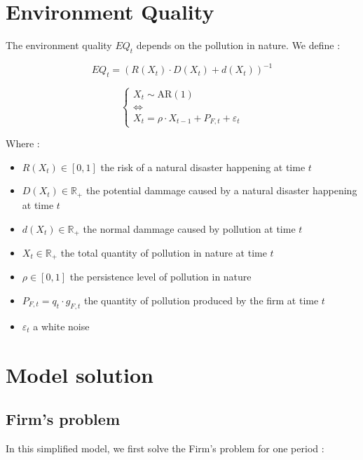 \documentclass{article}
\begin{document}
\section{Environment Quality}

The environment quality $EQ_{t}$ depends on the pollution in nature. We define : 

\begin{equation}
    EQ_{t}=\left(R(X_{t})\cdot D(X_{t})+d(X_{t})\right)^{-1}
\end{equation}

\begin{equation}
    \begin{cases}
        X_{t}\sim \text{AR}(1) \\
        \iff \\
        X_{t}=\rho\cdot X_{t-1}+P_{F,t}+\varepsilon_{t}
    \end{cases}
\end{equation}

Where :
\begin{itemize}
    \item $R(X_t)\in\left[0,1\right]$ the risk of a natural disaster happening at time $t$
    \item $D(X_t)\in\mathbb{R}_{+}$ the potential dammage caused by a natural disaster happening at time $t$
    \item $d(X_t)\in\mathbb{R}_{+}$ the normal dammage caused by pollution at time $t$
    \item $X_{t}\in\mathbb{R}_{+}$ the total quantity of pollution in nature at time $t$
    \item $\rho \in \left[0,1\right]$ the persistence level of pollution in nature
    \item $P_{F,t}=q_{t}\cdot g_{F,t}$ the quantity of pollution produced by the firm at time ${t}$
    \item $\varepsilon_{t}$ a white noise 
\end{itemize}

\section{Model solution}

\subsection{Firm's problem}

In this simplified model, we first solve the Firm's problem for one period : 
\end{document}
